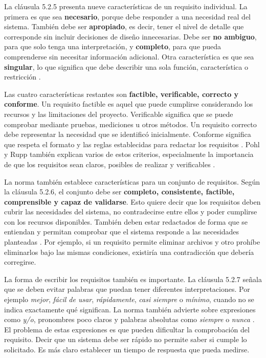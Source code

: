 \documentclass[10pt,a4paper]{article}
\begin{document}
La cláusula 5.2.5 presenta nueve características de un requisito individual. La primera es que sea \textbf{necesario}, porque debe responder a una necesidad real del sistema. También debe ser \textbf{apropiado}, es decir, tener el nivel de detalle que corresponde sin incluir decisiones de diseño innecesarias. Debe ser \textbf{no ambiguo}, para que solo tenga una interpretación, y \textbf{completo}, para que pueda comprenderse sin necesitar información adicional. Otra característica es que sea \textbf{singular}, lo que significa que debe describir una sola función, característica o restricción \cite[Cl.\ 5.2.5]{iso29148}.

Las cuatro características restantes son \textbf{factible, verificable, correcto y conforme}. Un requisito factible es aquel que puede cumplirse considerando los recursos y las limitaciones del proyecto. Verificable significa que se puede comprobar mediante pruebas, mediciones u otros métodos. Un requisito correcto debe representar la necesidad que se identificó inicialmente. Conforme significa que respeta el formato y las reglas establecidas para redactar los requisitos \cite[Cl.\ 5.2.5]{iso29148}. Pohl y Rupp también explican varios de estos criterios, especialmente la importancia de que los requisitos sean claros, posibles de realizar y verificables \cite[Sec.\ 4.6]{pohl2015}.

La norma también establece características para un conjunto de requisitos. Según la cláusula 5.2.6, el conjunto debe ser \textbf{completo, consistente, factible, comprensible y capaz de validarse}. Esto quiere decir que los requisitos deben cubrir las necesidades del sistema, no contradecirse entre ellos y poder cumplirse con los recursos disponibles. También deben estar redactados de forma que se entiendan y permitan comprobar que el sistema responde a las necesidades planteadas \cite[Cl.\ 5.2.6]{iso29148}. Por ejemplo, si un requisito permite eliminar archivos y otro prohíbe eliminarlos bajo las mismas condiciones, existiría una contradicción que debería corregirse.

La forma de escribir los requisitos también es importante. La cláusula 5.2.7 señala que se deben evitar palabras que puedan tener diferentes interpretaciones. Por ejemplo \emph{mejor}, \emph{fácil de usar}, \emph{rápidamente}, \emph{casi siempre} o \emph{mínimo}, cuando no se indica exactamente qué significan. La norma también advierte sobre expresiones como \emph{y/o}, pronombres poco claros y palabras absolutas como \emph{siempre} o \emph{nunca} \cite[Cl.\ 5.2.7]{iso29148}. El problema de estas expresiones es que pueden dificultar la comprobación del requisito. Decir que un sistema debe ser rápido no permite saber si cumple lo solicitado. Es más claro establecer un tiempo de respuesta que pueda medirse.
\end{document}
